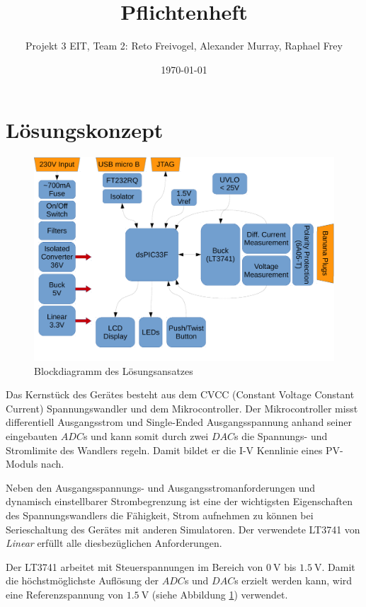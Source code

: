 \documentclass{article}
\title{Pflichtenheft}
\date{\today}
\author{Projekt 3 EIT, Team 2: Reto Freivogel, Alexander Murray, Raphael Frey}
\begin{document}
\maketitle

\section{L\"osungskonzept}
\begin{figure}[h!]
    \begin{centering}
    \includegraphics[width=.667\textwidth]{grob-blockdiagramm.pdf}
    \caption{Blockdiagramm des L\"osungsansatzes}
    \end{centering}
    \label{fig:grob-blockschaltbild}
\end{figure}

Das Kernst\"uck des Ger\"ates besteht  aus dem CVCC (Constant Voltage Constant
Current) Spannungswandler  und dem Mikrocontroller. Der  Mikrocontroller misst
differentiell  Ausgangsstrom und  Single-Ended Ausgangsspannung  anhand seiner
eingebauten  $ADC$s  und kann  somit  durch  zwei  $DAC$s die  Spannungs-  und
Stromlimite  des Wandlers  regeln. Damit  bildet er  die  I-V Kennlinie  eines
PV-Moduls nach.

Neben  den  Ausgangsspannungs-  und Ausgangsstromanforderungen  und  dynamisch
einstellbarer   Strombegrenzung  ist   eine   der  wichtigsten   Eigenschaften
des  Spannungswandlers  die  F\"ahigkeit,  Strom  aufnehmen  zu  k\"onnen  bei
Serieschaltung des  Ger\"ates mit anderen Simulatoren.   Der verwendete LT3741
von \emph{Linear} erf\"ullt alle diesbez\"uglichen Anforderungen.

Der LT3741  arbeitet mit Steuerspannungen  im Bereich von  $\SI{0}{\volt}$ bis
$\SI{1.5}{\volt}$. Damit die  h\"ochstm\"oglichste Aufl\"osung der  $ADC$s und
$DAC$s erzielt  werden kann, wird eine  Referenzspannung von $\SI{1.5}{\volt}$
(siehe Abbildung \ref{fig:grob-blockschaltbild}) verwendet.
\end{document}
